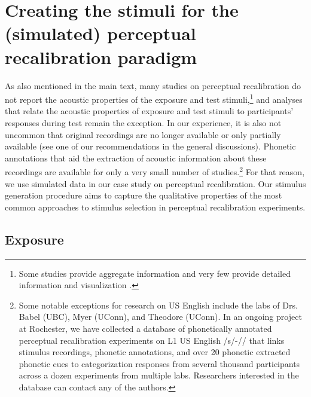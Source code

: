 \documentclass[
  11pt,
  man,floatsintext]{apa6}
\begin{document}
\section{Creating the stimuli for the (simulated) perceptual recalibration paradigm}\label{sec:SI-PR}

As also mentioned in the main text, many studies on perceptual recalibration do not report the acoustic properties of the exposure and test stimuli,\footnote{Some studies provide aggregate information \autocites[e.g.,][]{kraljic-samuel2006,kraljic-samuel2007} and very few provide detailed information and visualization \autocite[e.g.,][]{drouin2016}.} and analyses that relate the acoustic properties of exposure and test stimuli to participants' responses during test remain the exception. In our experience, it is also not uncommon that original recordings are no longer available or only partially available (see one of our recommendations in the general discussions). Phonetic annotations that aid the extraction of acoustic information about these recordings are available for only a very small number of studies.\footnote{Some notable exceptions for research on US English include the labs of Drs. Babel (UBC), Myer (UConn), and Theodore (UConn). In an ongoing project at Rochester, we have collected a database of phonetically annotated perceptual recalibration experiments on L1 US English /s/-// that links stimulus recordings, phonetic annotations, and over 20 phonetic extracted phonetic cues to categorization responses from several thousand participants across a dozen experiments from multiple labs. Researchers interested in the database can contact any of the authors.} For that reason, we use simulated data in our case study on perceptual recalibration. Our stimulus generation procedure aims to capture the qualitative properties of the most common approaches to stimulus selection in perceptual recalibration experiments.

\subsection{Exposure}\label{exposure}
\end{document}
